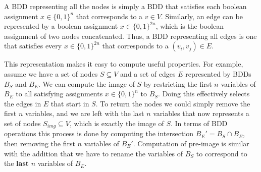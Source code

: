 \documentclass[../master/master.tex]{subfiles}
\begin{document}
A BDD representing all the nodes is simply a BDD that satisfies each boolean assignment $x\in\{0,1\}^n$ that corresponds to a $v\in V$. Similarly, an edge can be represented by a boolean assignment $x\in\{0,1\}^{2n}$, which is the boolean assignment of two nodes concatenated. Thus, a BDD representing all edges is one that satisfies every $x\in\{0,1\}^{2n}$ that corresponds to a $(v_i, v_j)\in E$.

This representation makes it easy to compute useful properties. For example, assume we have a set of nodes $S\subseteq V$ and a set of edges $E$ represented by BDDs $B_S$ and $B_E$. We can compute the image of $S$ by restricting the first $n$ variables of $B_E$ to all satisfying assignments $x\in\{0,1\}^{n}$ to $B_S$. Doing this effectively selects the edges in $E$ that start in $S$. To return the nodes we could simply remove the first $n$ variables, and we are left with the last $n$ variables that now represents a set of nodes $S_{img}\subseteq V$, which is exactly the image of $S$. In terms of BDD operations this process is done by computing the intersection $B_{E}' = B_S\cap B_E$, then removing the first $n$ variables of $B_E'$. Computation of pre-image is similar with the addition that we have to rename the variables of $B_S$ to correspond to the \textbf{last} $n$ variables of $B_E$.
\end{document}
